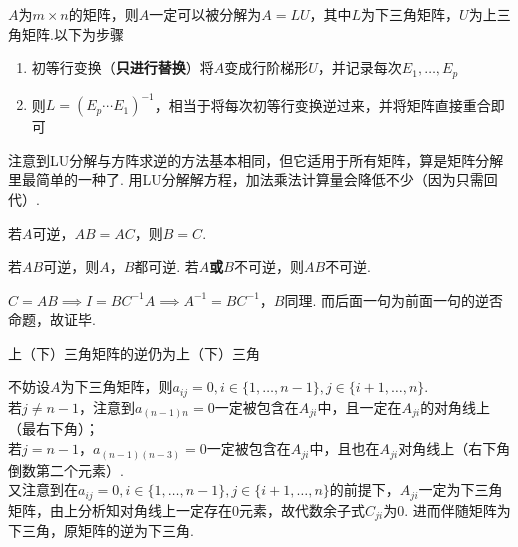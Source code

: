 \begin{myalgorithm}[LU分解]
$A$为$m\times n$的矩阵，则$A$一定可以被分解为$A=LU$，其中$L$为下三角矩阵，$U$为上三角矩阵.以下为步骤
\begin{enumerate}
	\itemsep -3pt
	\item 初等行变换（\textbf{只进行替换}）将$A$变成行阶梯形$U$，并记录每次$E_1,\dots,E_p$
	\item 则$L=(E_p\cdots E_1)^{-1}$，相当于将每次初等行变换逆过来，并将矩阵直接重合即可
\end{enumerate}
\end{myalgorithm}
\par 注意到LU分解与方阵求逆的方法基本相同，但它适用于所有矩阵，算是矩阵分解里最简单的一种了. 用LU分解解方程，加法乘法计算量会降低不少（因为只需回代）.
\begin{proposition}[消去律]
若$A$可逆，$AB=AC$，则$B=C$.
\end{proposition}
\begin{proposition}
若$AB$可逆，则$A$，$B$都可逆. 若$A$\textbf{或}$B$不可逆，则$AB$不可逆.
\end{proposition}
\begin{analysis}
$C=AB\implies I=BC^{-1}A\implies A^{-1}=BC^{-1}$，$B$同理. 而后面一句为前面一句的逆否命题，故证毕.
\end{analysis}
\begin{theorem}
上（下）三角矩阵的逆仍为上（下）三角
\end{theorem}
\begin{analysis}
不妨设$A$为下三角矩阵，则$a_{ij}=0,i\in\{1,\dots,n-1\},j\in\{i+1,\dots,n\}$.\\
若$j\ne n-1$，注意到$a_{(n-1)n}=0$一定被包含在$A_{ji}$中，且一定在$A_{ji}$的对角线上（最右下角）；\\
若$j=n-1$，$a_{(n-1)(n-3)}=0$一定被包含在$A_{ji}$中，且也在$A_{ji}$对角线上（右下角倒数第二个元素）.\\
又注意到在$a_{ij}=0,i\in\{1,\dots,n-1\},j\in\{i+1,\dots,n\}$的前提下，$A_{ji}$一定为下三角矩阵，由上分析知对角线上一定存在$0$元素，故代数余子式$C_{ji}$为$0$. 进而伴随矩阵为下三角，原矩阵的逆为下三角.
\end{analysis}

